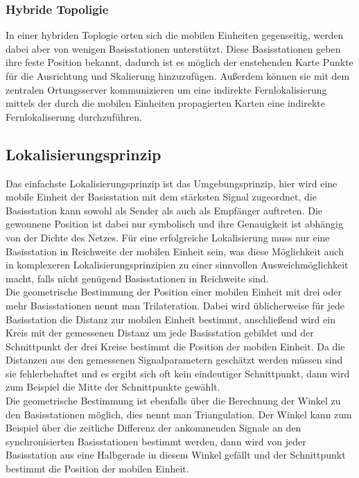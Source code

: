 \subsubsection{Hybride Topoligie}
In einer hybriden Toplogie orten sich die mobilen Einheiten gegenseitig, werden dabei aber von wenigen Basisstationen unterstützt.
Diese Basisstationen geben ihre feste Position bekannt, dadurch ist es möglich der enstehenden Karte Punkte für die Ausrichtung und Skalierung hinzuzufügen.
Außerdem können sie mit dem zentralen Ortungsserver kommunizieren um eine indirekte Fernlokalisierung mittels der durch die mobilen Einheiten propagierten Karten eine indirekte Fernlokaliserung durchzuführen.

\subsection{Lokalisierungsprinzip}
Das einfachste Lokalisierungsprinzip ist das Umgebungsprinzip, hier wird eine mobile Einheit der Basisstation mit dem stärksten Signal zugeordnet, die Basisstation kann sowohl als Sender als auch als Empfänger auftreten. Die gewonnene Position ist dabei nur symbolisch und ihre Genauigkeit ist abhängig von der Dichte des Netzes. Für eine erfolgreiche Lokalisierung muss nur eine Basisstation in Reichweite der mobilen Einheit sein, was diese Möglichkeit auch in komplexeren Lokalisierungsprinzipien zu einer sinnvollen Ausweichmöglichkeit macht, falls nicht genügend Basisstationen in Reichweite sind. \\
Die geometrische Bestimmung der Position einer mobilen Einheit mit drei oder mehr Basisstationen nennt man Trilateration. Dabei wird üblicherweise für jede Basisstation die Distanz zur mobilen Einheit bestimmt, anschließend wird ein Kreis mit der gemessenen Distanz um jede Basisstation gebildet und der Schnittpunkt der drei Kreise bestimmt die Position der mobilen Einheit. Da die Distanzen aus den gemessenen Signalparametern geschätzt werden müssen sind sie fehlerbehaftet und es ergibt sich oft kein eindeutiger Schnittpunkt, dann wird zum Beispiel die Mitte der Schnittpunkte gewählt. \\
Die geometrische Bestimmung ist ebenfalls über die Berechnung der Winkel zu den Basisstationen möglich, dies nennt man Triangulation. Der Winkel kann zum Beispiel über die zeitliche Differenz der ankommenden Signale an den synchronisierten Basisstationen bestimmt werden, dann wird von jeder Basisstation aus eine Halbgerade in diesem Winkel gefällt und der Schnittpunkt bestimmt die Position der mobilen Einheit. %
